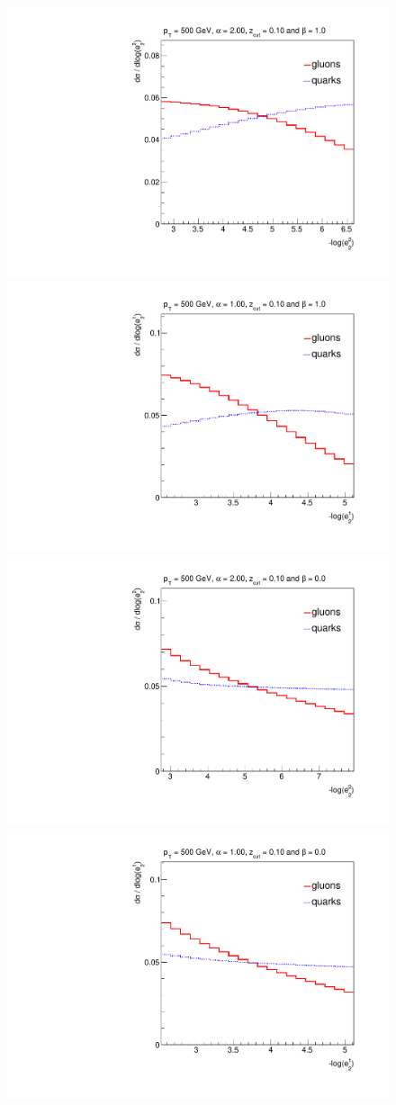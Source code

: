 \documentclass[11pt]{cernrep}
\begin{document}
\begin{figure}[t]
\begin{center}
\includegraphics[width = 0.49\columnwidth]{jetsub_alphas_PDFs_alpha_20zcut1_beta_1023451324.pdf}\includegraphics[width = 0.49\columnwidth]{jetsub_alphas_PDFs_alpha_10zcut1_beta_1023451324.pdf}\\
\includegraphics[width = 0.49\columnwidth]{jetsub_alphas_PDFs_alpha_20zcut1_beta_023451324.pdf}\includegraphics[width = 0.49\columnwidth]{jetsub_alphas_PDFs_alpha_10zcut1_beta_023451324.pdf}
\end{center}



\end{figure}
\end{document}
